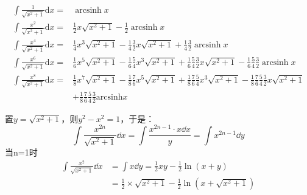 \begin{theorem}[平方和根式分子型]
    \vspace{-15pt}
    \begin{align*}
        \int\frac{1}{\sqrt{x^2+1}}\mathrm{d}x=&\operatorname{arcsinh}x\\
        \int\frac{x^2}{\sqrt{x^2+1}}\mathrm{d}x=&\frac{1}{2}x\sqrt{x^2+1}-\frac{1}{2}\operatorname{arcsinh}x\\
        \int\frac{x^4}{\sqrt{x^2+1}}\mathrm{d}x=&\frac{1}{4}x^{3}\sqrt{x^{2}+1}-\frac{1}{4}\frac{3}{2}x\sqrt{x^{2}+1}+\frac{1}{4}\frac{3}{2}\operatorname{arcsinh}x\\
        \int\frac{x^6}{\sqrt{x^2+1}}\mathrm{d}x=&\frac{1}{6}x^5\sqrt{x^2+1}-\frac{1}{6}\frac{5}{4}x^3\sqrt{x^2+1}+\frac{1}{6}\frac{5}{4}\frac{3}{2}x\sqrt{x^2+1}-\frac{1}{6}\frac{5}{4}\frac{3}{2}\operatorname{arcsinh}x\\
        \int\frac{x^8}{\sqrt{x^2+1}}\mathrm{d}x=&\frac{1}{8}x^{7}\sqrt{x^{2}+1}-\frac{1}{8}\frac{7}{6}x^{5}\sqrt{x^{2}+1}+\frac{1}{8}\frac{7}{6}\frac{5}{4}x^{3}\sqrt{x^{2}+1}-\frac{1}{8}\frac{7}{6}\frac{5}{4}\frac{3}{2}x\sqrt{x^{2}+1}\\
        &+\frac{1}{8}\frac{7}{6}\frac{5}{4}\frac{3}{2}\mathrm{arcsinh}x
    \end{align*}
\end{theorem}
置$y=\sqrt{x^{2}+1}$，则$y^2-x^2=1$，于是：
\[\int\frac{x^{2n}}{\sqrt{x^{2}+1}}\dd x=\int\frac{x^{2n-1}\cdot x\dd x}{y}=\int x^{2n-1}\dd y\]
当n=1时
\begin{align*}
\int\frac{x^{2}}{\sqrt{x^{2}+1}}\dd x&=\int x\dd y=\frac{1}{2}xy-\frac{1}{2}\ln(x+y)\\
&=\frac{1}{2}\times\sqrt{x^{2}+1}-\frac{1}{2}\ln(x+\sqrt{x^{2}+1})
\end{align*}

